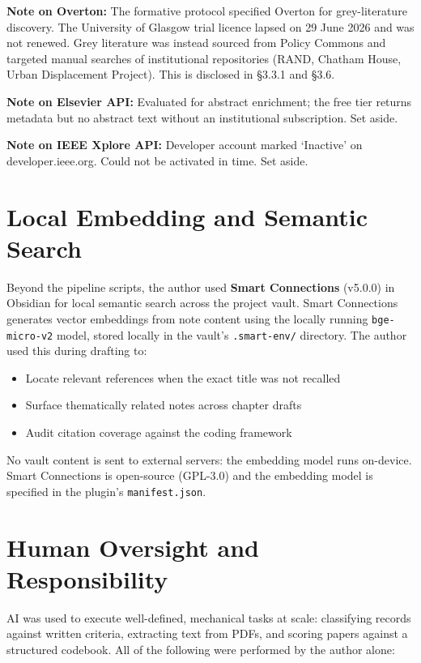 \textbf{Note on Overton:} The formative protocol specified Overton for grey-literature discovery. The University of Glasgow trial licence lapsed on 29 June 2026 and was not renewed. Grey literature was instead sourced from Policy Commons and targeted manual searches of institutional repositories (RAND, Chatham House, Urban Displacement Project). This is disclosed in \S 3.3.1 and \S 3.6.

\textbf{Note on Elsevier API:} Evaluated for abstract enrichment; the free tier returns metadata but no abstract text without an institutional subscription. Set aside.

\textbf{Note on IEEE Xplore API:} Developer account marked `Inactive' on developer.ieee.org. Could not be activated in time. Set aside.

\section{Local Embedding and Semantic Search}

Beyond the pipeline scripts, the author used \textbf{Smart Connections} (v5.0.0) in Obsidian for local semantic search across the project vault. Smart Connections generates vector embeddings from note content using the locally running \texttt{bge-micro-v2} model, stored locally in the vault's \texttt{.smart-env/} directory. The author used this during drafting to:

\begin{itemize}
  \item Locate relevant references when the exact title was not recalled
  \item Surface thematically related notes across chapter drafts
  \item Audit citation coverage against the coding framework
\end{itemize}

No vault content is sent to external servers: the embedding model runs on-device. Smart Connections is open-source (GPL-3.0) and the embedding model is specified in the plugin's \texttt{manifest.json}.

\section{Human Oversight and Responsibility}

AI was used to execute well-defined, mechanical tasks at scale: classifying records against written criteria, extracting text from PDFs, and scoring papers against a structured codebook. All of the following were performed by the author alone:

